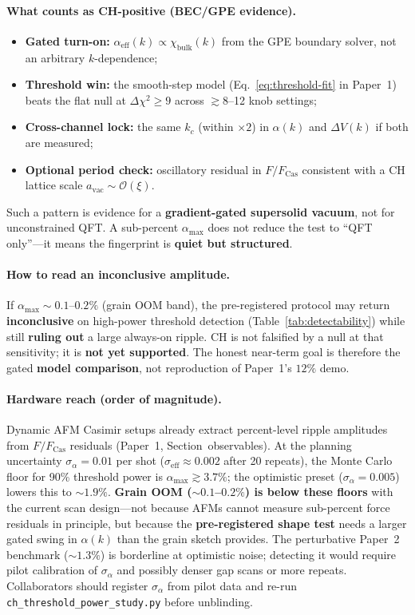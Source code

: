 \documentclass[11pt,a4paper]{article}
\begin{document}
\paragraph{What counts as CH-positive (BEC/GPE evidence).}
\begin{itemize}[nosep]
  \item \textbf{Gated turn-on:} $\alpha_{\mathrm{eff}}(k) \propto \chi_{\mathrm{bulk}}(k)$ from the GPE boundary solver, not an arbitrary $k$-dependence;
  \item \textbf{Threshold win:} the smooth-step model (Eq.~\ref{eq:threshold-fit} in Paper~1) beats the flat null at
  $\Delta\chi^2 \ge 9$ across $\gtrsim 8$--12 knob settings;
  \item \textbf{Cross-channel lock:} the same $k_c$ (within $\times 2$) in $\alpha(k)$ and $\Delta V(k)$ if both are measured;
  \item \textbf{Optional period check:} oscillatory residual in $F/F_{\mathrm{Cas}}$ consistent with a CH lattice scale $a_{\mathrm{vac}} \sim \mathcal{O}(\xi)$.
\end{itemize}
Such a pattern is evidence for a \textbf{gradient-gated supersolid vacuum}, not for unconstrained QFT.
A sub-percent $\alpha_{\max}$ does not reduce the test to ``QFT only''---it means the fingerprint is \textbf{quiet but structured}.

\paragraph{How to read an inconclusive amplitude.}
If $\alpha_{\max} \sim 0.1$--$0.2\%$ (grain OOM band), the pre-registered protocol may return
\textbf{inconclusive} on high-power threshold detection (Table~\ref{tab:detectability}) while still
\textbf{ruling out} a large always-on ripple.
CH is not falsified by a null at that sensitivity; it is \textbf{not yet supported}.
The honest near-term goal is therefore the gated \textbf{model comparison}, not reproduction of Paper~1's $12\%$ demo.

\paragraph{Hardware reach (order of magnitude).}
Dynamic AFM Casimir setups already extract percent-level ripple amplitudes from $F/F_{\mathrm{Cas}}$ residuals
(Paper~1, Section~observables).
At the planning uncertainty $\sigma_\alpha = 0.01$ per shot ($\sigma_{\mathrm{eff}} \approx 0.002$ after 20 repeats),
the Monte Carlo floor for 90\% threshold power is $\alpha_{\max} \gtrsim 3.7\%$; the optimistic preset ($\sigma_\alpha = 0.005$) lowers this to $\sim 1.9\%$.
\textbf{Grain OOM ($\sim 0.1$--$0.2\%$) is below these floors} with the current scan design---not because AFMs cannot measure sub-percent force residuals in principle, but because the \textbf{pre-registered shape test} needs a larger gated swing in $\alpha(k)$ than the grain sketch provides.
The perturbative Paper~2 benchmark ($\sim 1.3\%$) is borderline at optimistic noise; detecting it would require pilot calibration of $\sigma_\alpha$ and possibly denser gap scans or more repeats.
Collaborators should register $\sigma_\alpha$ from pilot data and re-run \texttt{ch\_threshold\_power\_study.py} before unblinding.
\end{document}
